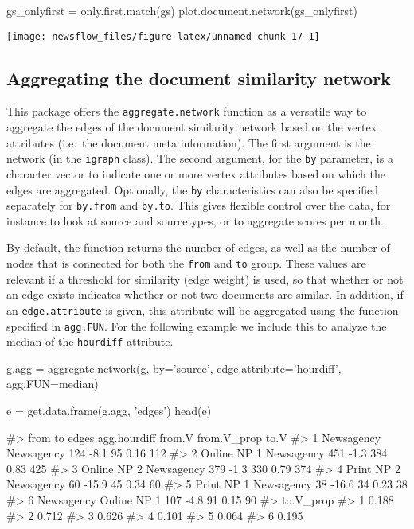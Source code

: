 \begin{Schunk}
\begin{Sinput}
gs_onlyfirst = only.first.match(gs)
plot.document.network(gs_onlyfirst)
\end{Sinput}

\texttt{[image: newsflow\_files/figure-latex/unnamed-chunk-17-1]} \end{Schunk}

\subsection{Aggregating the document similarity
network}\label{aggregating-the-document-similarity-network}

This package offers the \texttt{aggregate.network} function as a
versatile way to aggregate the edges of the document similarity network
based on the vertex attributes (i.e.~the document meta information). The
first argument is the network (in the \texttt{igraph} class). The second
argument, for the \texttt{by} parameter, is a character vector to
indicate one or more vertex attributes based on which the edges are
aggregated. Optionally, the \texttt{by} characteristics can also be
specified separately for \texttt{by.from} and \texttt{by.to}. This gives
flexible control over the data, for instance to look at source and
sourcetypes, or to aggregate scores per month.

By default, the function returns the number of edges, as well as the
number of nodes that is connected for both the \texttt{from} and
\texttt{to} group. These values are relevant if a threshold for
similarity (edge weight) is used, so that whether or not an edge exists
indicates whether or not two documents are similar. In addition, if an
\texttt{edge.attribute} is given, this attribute will be aggregated
using the function specified in \texttt{agg.FUN}. For the following
example we include this to analyze the median of the \texttt{hourdiff}
attribute.

\begin{Schunk}
\begin{Sinput}
g.agg = aggregate.network(g, by='source', edge.attribute='hourdiff', agg.FUN=median)

e = get.data.frame(g.agg, 'edges')
head(e)
\end{Sinput}
\begin{Soutput}
#>          from          to edges agg.hourdiff from.V from.V_prop to.V
#> 1  Newsagency  Newsagency   124         -8.1     95        0.16  112
#> 2 Online NP 1  Newsagency   451         -1.3    384        0.83  425
#> 3 Online NP 2  Newsagency   379         -1.3    330        0.79  374
#> 4  Print NP 2  Newsagency    60        -15.9     45        0.34   60
#> 5  Print NP 1  Newsagency    38        -16.6     34        0.23   38
#> 6  Newsagency Online NP 1   107         -4.8     91        0.15   90
#>   to.V_prop
#> 1     0.188
#> 2     0.712
#> 3     0.626
#> 4     0.101
#> 5     0.064
#> 6     0.195
\end{Soutput}
\end{Schunk}

